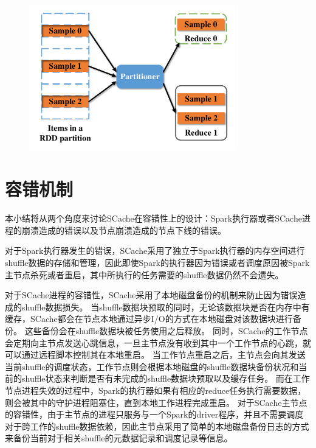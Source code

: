 \begin{figure}[!htp]
	\centering
	\includegraphics[width=0.8\textwidth]{../../PPoPP-2018/fig/sample.pdf}
\end{figure}

\section{容错机制}

本小结将从两个角度来讨论SCache在容错性上的设计：Spark执行器或者SCache进程的崩溃造成的错误以及节点崩溃造成的节点下线的错误。

对于Spark执行器发生的错误，SCache采用了独立于Spark执行器的内存空间进行shuffle数据的存储和管理，因此即使Spark的执行器因为错误或者调度原因被Spark主节点杀死或者重启，其中所执行的任务需要的shuffle数据仍然不会遗失。

对于SCache进程的容错性，SCache采用了本地磁盘备份的机制来防止因为错误造成的shuffle数据损失。
当shuffle数据块预取的同时，无论该数据块是否在内存中有缓存，SCache都会在节点本地通过异步I/O的方式在本地磁盘对该数据块进行备份。
这些备份会在shuffle数据块被任务使用之后释放。
同时，SCache的工作节点会定期向主节点发送心跳信息，一旦主节点没有收到其中一个工作节点的心跳，就可以通过远程脚本控制其在本地重启。
当工作节点重启之后，主节点会向其发送当前shuffle的调度状态，工作节点则会根据本地磁盘的shuffle数据块备份状况和当前的shuffle状态来判断是否有未完成的shuffle数据块预取以及缓存任务。
而在工作节点进程失效的过程中，Spark的执行器如果有相应的reduce任务执行需要数据，则会被其中的守护进程阻塞住，直到本地工作进程完成重启。
对于SCache主节点的容错性，由于主节点的进程只服务与一个Spark的driver程序，并且不需要调度对于跨工作的shuffle数据依赖，因此主节点采用了简单的本地磁盘备份日志的方式来备份当前对于相关shuffle的元数据记录和调度记录等信息。

